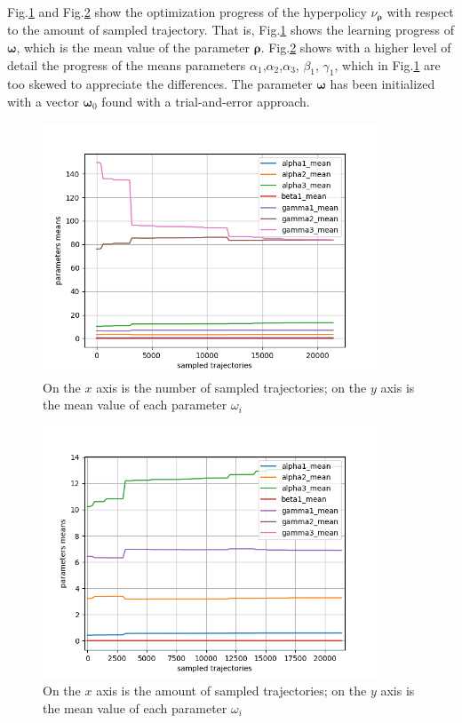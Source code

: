 Fig.\ref{fig:means} and Fig.\ref{fig:means2} show the optimization progress of the hyperpolicy $\nu_{\boldsymbol \rho}$ with respect to the amount of sampled trajectory.
That is, Fig.\ref{fig:means} shows the learning progress of $\boldsymbol \omega$, which is the mean value of the parameter $\boldsymbol \rho$.
Fig.\ref{fig:means2} shows with a higher level of detail the progress of the means parameters $\alpha_1$,$\alpha_2$,$\alpha_3$, $\beta_1$, $\gamma_1$, which in Fig.\ref{fig:means} are too skewed to appreciate the differences.
The parameter $\boldsymbol \omega$ has been initialized with a vector $\boldsymbol \omega_0$ found with a trial-and-error approach.

\begin{figure}[H]
 \centering
  \captionsetup{width=10cm}
  \includegraphics[width=10cm]{./img/parameters/means1}
  \caption{On the $x$ axis is the number of sampled trajectories; on the $y$ axis is the mean value of each parameter $\omega_i$}
   \label{fig:means}
\end{figure}

\begin{figure}[H]
 \centering
  \captionsetup{width=10cm}
  \includegraphics[width=10cm]{./img/parameters/means2}
  \caption{On the $x$ axis is the amount of sampled trajectories; on the $y$ axis is the mean value of each parameter $\omega_i$}
   \label{fig:means2}
\end{figure}


